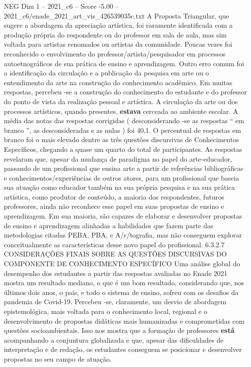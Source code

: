 \begin{textsample}{NEG Dim 1 – 2021\_c6 – Score -5.00 – 2021\_c6/enade\_2021\_art\_vis\_426539035c.txt}
A Proposta Triangular, que sugere a abordagem da apreciação artística, foi raramente identificada com a produção própria do respondente ou do professor em sala de aula, mas sim voltada para artistas renomados ou artistas da comunidade.
Poucas vezes foi reconhecido o envolvimento do professor/artista/pesquisador em processos autoetnográficos de sua prática de ensino e aprendizagem.
Outro erro comum foi a identificação da circulação e a publicação da pesquisa em arte ou o entendimento da arte na construção do conhecimento acadêmico.
Em muitas respostas, percebeu -se a construção do conhecimento do estudante e do professor do ponto de vista da realização pessoal e artística.
A circulação da arte ou dos processos artísticos, quando presentes, \textbf{estava} cerceada ao ambiente escolar.
A média das notas das respostas corrigidas ( desconsiderando -se as respostas “ em branco ”, as desconsideradas e as nulas ) foi 40,1.
O percentual de respostas em branco foi o mais elevado dentre as três questões discursivas de Conhecimentos Específicos, chegando a quase um quarto do total de participantes.
As respostas revelaram que, apesar da mudança de paradigma no papel do arte-educador, passando de um profissional que ensina arte a partir de referências bibliográficas e conhecimentos/experiências de outros atores, para um profissional que baseia sua atuação como educador também na sua própria pesquisa e na sua prática artística, como produtor de conteúdo, a maioria dos respondentes, futuros professores, ainda não reconhece esse papel em suas propostas de ensino e aprendizagem.
Em sua maioria, são capazes de elaborar e desenvolver propostas de ensino e aprendizagem alinhadas a habilidades que fazem parte das metodologias citadas PEBA, PBA, e A/r/tografia, mas não conseguem explorar conceitualmente as características desse novo papel do profissional. 6.3.2.7 CONSIDERAÇÕES FINAIS SOBRE AS QUESTÕES DISCURSIVAS DO COMPONENTE DE CONHECIMENTO ESPECÍFICO Uma análise global do desempenho dos estudantes a partir das respostas avaliadas no Enade 2021 mostra um resultado mediano, o que é um bom resultado, considerando que, nos últimos dois anos, o país, e todo o sistema de ensino, sofreu com os desafios da pandemia de Covid-19.
Percebeu -se, claramente, um desvio de abordagem epistemológica, mais voltada para o conhecimento local, regional e o desenvolvimento de propostas didáticas mais humanizadas e comprometidas com questões socioambientais.
Isso nos mostra que a formação de professores \textbf{está} acompanhando a conjuntura globalizada e que, apesar das dificuldades de interpretação e de redação, os estudantes conseguem se posicionar e desenvolver propostas no seu campo de atuação.

\end{textsample}
